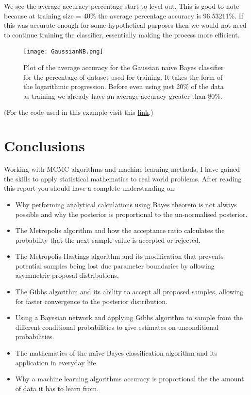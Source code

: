 \documentclass[12pt,twoside]{report}   %
\begin{document}
We see the average accuracy percentage start to level out. This is good to note because at training size = 40\% the average percentage accuracy is 96.53211\%. If this was accurate enough for some hypothetical purposes then we would not need to continue training the classifier, essentially making the process more efficient.
\begin{figure}[H]
\centering
\texttt{[image: GaussianNB.png]}
\caption{Plot of the average accuracy for the Gaussian na\"{i}ve Bayes classifier for the percentage of dataset used for training. It takes the form of the logarithmic progression. Before even using just 20\% of the data as training we already have an average accuracy greater than 80\%.}
\label{fig4.2}
\end{figure}

(For the code used in this example visit this \href{https://github.com/iMikeT/MathProject2/tree/master/Python%20Code/Wine%20Classification}{link}.)

\section*{Conclusions}
\vspace{-0.4in}
\underline{\hspace{6.2in}}
\vspace{-0.1in}

Working with MCMC algorithms and machine learning methods, I have gained the skills to apply statistical mathematics to real world problems. After reading this report you should have a complete understanding on:
\begin{itemize}
\item Why performing analytical calculations using Bayes theorem is not always possible and why the posterior is proportional to the un-normalised posterior.
\item The Metropolis algorithm and how the acceptance ratio calculates the probability that the next sample value is accepted or rejected.
\item The Metropolis-Hastings algorithm and its modification that prevents potential samples being lost due parameter boundaries by allowing asymmetric proposal distributions.
\item The Gibbs algorithm and its ability to accept all proposed samples, allowing for faster convergence to the posterior distribution.
\item Using a Bayesian network and applying Gibbs algorithm to sample from the different conditional probabilities to give estimates on unconditional probabilities.
\item The mathematics of the na\"{i}ve Bayes classification algorithm and its application in everyday life.
\item Why a machine learning algorithms accuracy is proportional the the amount of data it has to learn from.
\end{itemize}
\end{document}
